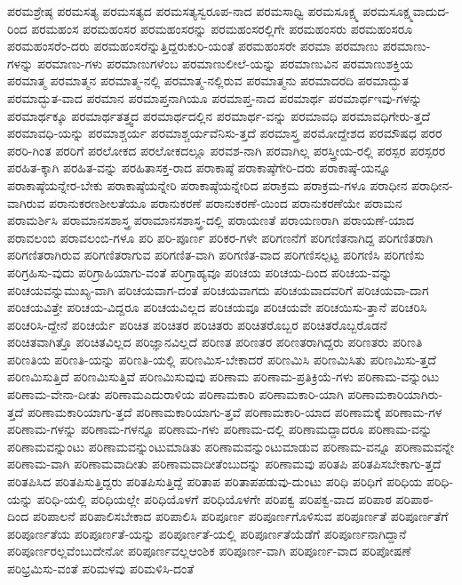 {ಪರಮಶ್ರೇಷ್ಠ
ಪರಮಸತ್ಯ
ಪರಮಸತ್ಯದ
ಪರಮಸತ್ಯಸ್ವರೂಪ-ನಾದ
ಪರಮಸಾಧ್ವಿ
ಪರಮಸೂಕ್ಷ್ಮ
ಪರಮಸೂಕ್ಷ್ಮವಾದುದ-ರಿಂದ
ಪರಮಹಂಸ
ಪರಮಹಂಸರ
ಪರಮಹಂಸರನ್ನು
ಪರಮಹಂಸರಲ್ಲಿಗೇ
ಪರಮಹಂಸರು
ಪರಮಹಂಸರೂ
ಪರಮಹಂಸರೆಂ-ದರು
ಪರಮಹಂಸರೆನ್ನುತ್ತಿದ್ದರುಕುರಿ-ಯಂತೆ
ಪರಮಹಂಸರೇ
ಪರಮಾ
ಪರಮಾಣು
ಪರಮಾಣು-ಗಳನ್ನು
ಪರಮಾಣು-ಗಳು
ಪರಮಾಣುಗಳೆಂಬ
ಪರಮಾಣುಲೀಲೆ-ಯನ್ನು
ಪರಮಾಣುವಿನ
ಪರಮಾಣುಶಕ್ತಿಯ
ಪರಮಾತ್ಮ
ಪರಮಾತ್ಮನ
ಪರಮಾತ್ಮ-ನಲ್ಲಿ
ಪರಮಾತ್ಮ-ನಲ್ಲಿರುವ
ಪರಮಾತ್ಮನು
ಪರಮಾದರದಿ
ಪರಮಾದ್ಭುತ
ಪರಮಾದ್ಭುತ-ವಾದ
ಪರಮಾನ
ಪರಮಾಪ್ತನಾಗಿಯೂ
ಪರಮಾಪ್ತ-ನಾದ
ಪರಮಾರ್ಥ
ಪರಮಾರ್ಥಇವು-ಗಳನ್ನು
ಪರಮಾರ್ಥಕ್ಕೂ
ಪರಮಾರ್ಥತತ್ತ್ವದ
ಪರಮಾರ್ಥದಲ್ಲಿನ
ಪರಮಾರ್ಥ-ವನ್ನು
ಪರಮಾವಧಿ
ಪರಮಾವಧಿಗೇರು-ತ್ತದೆ
ಪರಮಾವಧಿ-ಯನ್ನು
ಪರಮಾಶ್ಚರ್ಯ
ಪರಮಾಶ್ಚರ್ಯವೆನಿಸು-ತ್ತದೆ
ಪರಮಾಸ್ತ್ರ
ಪರಮೋದ್ದೇಶದ
ಪರಮೌಷಧ
ಪರರ
ಪರರಿ-ಗಿಂತ
ಪರರಿಗೆ
ಪರಲೋಕದ
ಪರಲೋಕದಲ್ಲೂ
ಪರವಶ-ನಾಗಿ
ಪರವಾಗಿಲ್ಲ
ಪರಸ್ತ್ರೀಯ-ರಲ್ಲಿ
ಪರಸ್ಪರ
ಪರಸ್ಪರರ
ಪರಹಿತ-ಕ್ಕಾಗಿ
ಪರಹಿತ-ವನ್ನು
ಪರಹಿತಾಸಕ್ತ-ರಾದ
ಪರಾಕಾಷ್ಠೆ
ಪರಾಕಾಷ್ಠೆಗೇರಿ-ದರು
ಪರಾಕಾಷ್ಠೆ-ಯನ್ನೂ
ಪರಾಕಾಷ್ಠೆಯನ್ನೇರ-ಬೇಕು
ಪರಾಕಾಷ್ಠೆಯನ್ನೇರಿ
ಪರಾಕಾಷ್ಠೆಯನ್ನೇರಿದ
ಪರಾಕ್ರಮ
ಪರಾಕ್ರಮ-ಗಳೂ
ಪರಾಧೀನ
ಪರಾಧೀನ-ವಾಗಿರುವ
ಪರಾನುಕರಣಶೀಲತೆಯೂ
ಪರಾನುಕರಣೆ
ಪರಾನುಕರಣೆ-ಯಿಂದ
ಪರಾನುಕರಣೆಯೇ
ಪರಾಮನ
ಪರಾಮರ್ಶಿಸಿ
ಪರಾಮಾನಸಶಾಸ್ತ್ರ
ಪರಾಮಾನಸಶಾಸ್ತ್ರ-ದಲ್ಲಿ
ಪರಾಯಣತೆ
ಪರಾಯಣರಾಗಿ
ಪರಾಯಣೆ-ಯಾದ
ಪರಾವಲಂಬಿ
ಪರಾವಲಂಬಿ-ಗಳೂ
ಪರಿ
ಪರಿ-ಪೂರ್ಣ
ಪರಿಕರ-ಗಳೇ
ಪರಿಗಣನೆಗೆ
ಪರಿಗಣಿತನಾಗಿದ್ದ
ಪರಿಗಣಿತರಾಗಿ
ಪರಿಗಣಿತರಾಗಿರುವ
ಪರಿಗಣಿತರಾಗುವ
ಪರಿಗಣಿತ-ವಾಗಿ
ಪರಿಗಣಿತ-ವಾದ
ಪರಿಗಣಿಸಲ್ಪಟ್ಟ
ಪರಿಗಣಿಸಿ
ಪರಿಗಣಿಸು
ಪರಿಗ್ರಹಿಸು-ವುದು
ಪರಿಗ್ರಾಹಿಯಾಗು-ವಂತೆ
ಪರಿಗ್ರಾಹ್ಯವೂ
ಪರಿಚಯ
ಪರಿಚಯ-ದಿಂದ
ಪರಿಚಯ-ವನ್ನು
ಪರಿಚಯವನ್ನುಮುಖ್ಯ-ವಾಗಿ
ಪರಿಚಯವಾಗ-ದಂತೆ
ಪರಿಚಯವಾಗದು
ಪರಿಚಯವಾದವರಿಗೆ
ಪರಿಚಯವಾ-ದಾಗ
ಪರಿಚಯವಿತ್ತೇ
ಪರಿಚಯ-ವಿದ್ದರೂ
ಪರಿಚಯವಿಲ್ಲದ
ಪರಿಚಯವೂ
ಪರಿಚಯವೇ
ಪರಿಚಯಿಸು-ತ್ತಾನೆ
ಪರಿಚರಿಸಿ
ಪರಿಚರಿಸಿ-ದ್ದೇನೆ
ಪರಿಚರ್ಯೆ
ಪರಿಚಿತ
ಪರಿಚಿತರ
ಪರಿಚಿತರು
ಪರಿಚಿತರೊಬ್ಬರ
ಪರಿಚಿತರೊಬ್ಬರೊಡನೆ
ಪರಿಚಿತವಾಗಿತ್ತೊ
ಪರಿಚಿತವಿಲ್ಲದ
ಪರಿಜ್ಞಾನವಿಲ್ಲದೆ
ಪರಿಣತ
ಪರಿಣತರ
ಪರಿಣತರಾಗಿದ್ದರು
ಪರಿಣತರು
ಪರಿಣತಿ
ಪರಿಣತಿಯ
ಪರಿಣತಿ-ಯನ್ನು
ಪರಿಣತಿ-ಯಲ್ಲಿ
ಪರಿಣಮಿಸ-ಬೇಕಾದರೆ
ಪರಿಣಮಿಸಿ
ಪರಿಣಮಿಸಿತು
ಪರಿಣಮಿಸು-ತ್ತದೆ
ಪರಿಣಮಿಸುತ್ತಿದೆ
ಪರಿಣಮಿಸುತ್ತಿವೆ
ಪರಿಣಮಿಸುವುವು
ಪರಿಣಾಮ
ಪರಿಣಾಮ-ಪ್ರತಿಕ್ರಿಯೆ-ಗಳು
ಪರಿಣಾಮ-ವನ್ನುಂಟು
ಪರಿಣಾಮ-ವೇನಾ-ದೀತು
ಪರಿಣಾಮಎದುರಾಳಿಯ
ಪರಿಣಾಮಕಾರಿ
ಪರಿಣಾಮಕಾರಿ-ಯಾಗಿ
ಪರಿಣಾಮಕಾರಿಯಾಗಿರು-ತ್ತದೆ
ಪರಿಣಾಮಕಾರಿಯಾಗು-ತ್ತದೆ
ಪರಿಣಾಮಕಾರಿಯಾಗು-ತ್ತವೆ
ಪರಿಣಾಮಕಾರಿ-ಯಾದ
ಪರಿಣಾಮಕ್ಕೆ
ಪರಿಣಾಮ-ಗಳ
ಪರಿಣಾಮ-ಗಳನ್ನು
ಪರಿಣಾಮ-ಗಳನ್ನೂ
ಪರಿಣಾಮ-ಗಳು
ಪರಿಣಾಮ-ದಲ್ಲಿ
ಪರಿಣಾಮದ್ದಾದರೂ
ಪರಿಣಾಮ-ವನ್ನು
ಪರಿಣಾಮವನ್ನುಂಟು
ಪರಿಣಾಮವನ್ನುಂಟುಮಾಡಿತು
ಪರಿಣಾಮವನ್ನುಂಟುಮಾಡುವ
ಪರಿಣಾಮ-ವನ್ನೂ
ಪರಿಣಾಮವನ್ನೇ
ಪರಿಣಾಮ-ವಾಗಿ
ಪರಿಣಾಮವಾದೀತು
ಪರಿಣಾಮವಾದೀತೆಂಬುದನ್ನು
ಪರಿಣಾಮವು
ಪರಿತಪಿ
ಪರಿತಪಿಸಬೇಕಾಗು-ತ್ತದೆ
ಪರಿತಪಿಸಿದ
ಪರಿತಪಿಸುತ್ತಿದ್ದರು
ಪರಿತಪಿಸುತ್ತಿದ್ದೆ
ಪರಿತಾಪ
ಪರಿತಾಪಪಡುವು-ದುಂಟು
ಪರಿಧಿ
ಪರಿಧಿಗೆ
ಪರಿಧಿಯ
ಪರಿಧಿ-ಯನ್ನು
ಪರಿಧಿ-ಯಲ್ಲಿ
ಪರಿಧಿಯಲ್ಲೇ
ಪರಿಧಿಯೊಳಗೆ
ಪರಿಧಿಯೊಳಗೇ
ಪರಿಪಕ್ವ
ಪರಿಪಕ್ವ-ವಾದ
ಪರಿಪಾಠ
ಪರಿಪಾಠ-ದಿಂದ
ಪರಿಪಾಲನೆ
ಪರಿಪಾಲಿಸಬೇಕಾದ
ಪರಿಪಾಲಿಸಿ
ಪರಿಪೂರ್ಣ
ಪರಿಪೂರ್ಣಗೊಳಿಸುವ
ಪರಿಪೂರ್ಣತೆ
ಪರಿಪೂರ್ಣತೆಗೆ
ಪರಿಪೂರ್ಣತೆಯ
ಪರಿಪೂರ್ಣತೆ-ಯನ್ನು
ಪರಿಪೂರ್ಣತೆ-ಯಲ್ಲಿ
ಪರಿಪೂರ್ಣತೆಯೆಡೆಗೆ
ಪರಿಪೂರ್ಣನಾಗಿದ್ದಾನೆ
ಪರಿಪೂರ್ಣರಲ್ಲವೆಂಬುದೇನೋ
ಪರಿಪೂರ್ಣವಲ್ಲಆಂಶಿಕ
ಪರಿಪೂರ್ಣ-ವಾಗಿ
ಪರಿಪೂರ್ಣ-ವಾದ
ಪರಿಪೋಷಣೆ
ಪರಿಭ್ರಮಿಸು-ವಂತೆ
ಪರಿಮಳವು
ಪರಿಮಳಿಸಿ-ದಂತೆ
}
